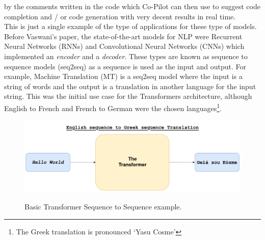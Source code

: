 by the comments written in the code which Co-Pilot can then use to suggest code completion and / or code generation with very decent results in real time.\\
This is just a single example of the type of applications for these type of models.
\bigbreak
Before Vaswani's paper, the state-of-the-art models for NLP were Recurrent Neural Networks (RNNs) and Convolutional Neural Networks (CNNs) which implemented an
\emph{encoder} and a \emph{decoder}. 
\bigbreak
These types are known as sequence to sequence models (seq2seq) as a sequence is used as the input and output.
For example, Machine Translation (MT) is a seq2seq model where the input is a string of words and the output is a translation in another language for the
input string. This was the initial use case for the Transformers architecture, although English to French and French to German were the chosen
languages\footnote{The Greek translation is pronounced `Yasu Cosme'}.
\begin{figure}[H]
	\centering
	\includegraphics[width=0.8\linewidth]{figures/basic_transformer.png}
	\label{fig:basic_transformer}
	\caption{Basic Transformer Sequence to Sequence example.}
\end{figure}
\newpage
